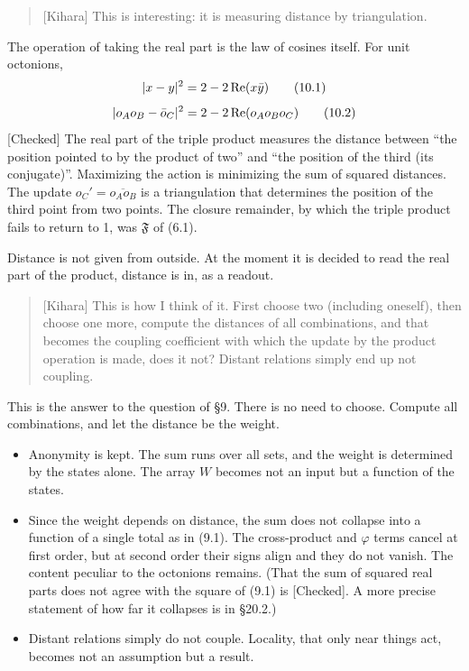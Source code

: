 \documentclass[
  a4paper,
]{article}
\providecommand{\tightlist}{%
  \setlength{\itemsep}{0pt}\setlength{\parskip}{0pt}}
\begin{document}
\begin{quote}
{[}Kihara{]} This is interesting: it is measuring distance by
triangulation.
\end{quote}

The operation of taking the real part is the law of cosines itself. For
unit octonions, \[
\lvert x - y\rvert^2 = 2 - 2\,{\rm Re}(x\bar y) \tag{10.1}
\] \[
\lvert o_Ao_B - \bar o_C\rvert^2 = 2 - 2\,{\rm Re}(o_Ao_Bo_C) \tag{10.2}
\] {[}Checked{]} The real part of the triple product measures the
distance between ``the position pointed to by the product of two'' and
``the position of the third (its conjugate)''. Maximizing the action is
minimizing the sum of squared distances. The update
\(o_C' = \overline{o_Ao_B}\) is a triangulation that determines the
position of the third point from two points. The closure remainder, by
which the triple product fails to return to 1, was \(\mathfrak{F}\) of
(6.1).

Distance is not given from outside. At the moment it is decided to read
the real part of the product, distance is in, as a readout.

\begin{quote}
{[}Kihara{]} This is how I think of it. First choose two (including
oneself), then choose one more, compute the distances of all
combinations, and that becomes the coupling coefficient with which the
update by the product operation is made, does it not? Distant relations
simply end up not coupling.
\end{quote}

This is the answer to the question of §9. There is no need to choose.
Compute all combinations, and let the distance be the weight.

\begin{itemize}
\tightlist
\item
  Anonymity is kept. The sum runs over all sets, and the weight is
  determined by the states alone. The array \(W\) becomes not an input
  but a function of the states.
\item
  Since the weight depends on distance, the sum does not collapse into a
  function of a single total as in (9.1). The cross-product and
  \(\varphi\) terms cancel at first order, but at second order their
  signs align and they do not vanish. The content peculiar to the
  octonions remains. (That the sum of squared real parts does not agree
  with the square of (9.1) is {[}Checked{]}. A more precise statement of
  how far it collapses is in §20.2.)
\item
  Distant relations simply do not couple. Locality, that only near
  things act, becomes not an assumption but a result.
\end{itemize}
\end{document}
